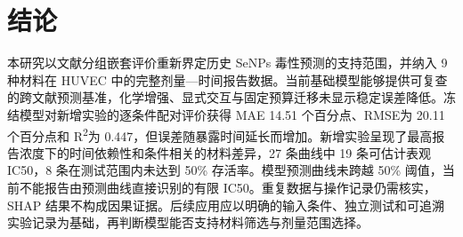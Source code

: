 \section{结论}

本研究以文献分组嵌套评价重新界定历史 SeNPs 毒性预测的支持范围，并纳入 9 种材料在 HUVEC 中的完整剂量—时间报告数据。当前基础模型能够提供可复查的跨文献预测基准，化学增强、显式交互与固定预算迁移未显示稳定误差降低。冻结模型对新增实验的逐条件配对评价获得 MAE 14.51 个百分点、RMSE为 20.11 个百分点和 R\textsuperscript{2}为 0.447，但误差随暴露时间延长而增加。新增实验呈现了最高报告浓度下的时间依赖性和条件相关的材料差异，27 条曲线中 19 条可估计表观 IC50，8 条在测试范围内未达到 50\% 存活率。模型预测曲线未跨越 50\% 阈值，当前不能报告由预测曲线直接识别的有限 IC50。重复数据与操作记录仍需核实，SHAP 结果不构成因果证据。后续应用应以明确的输入条件、独立测试和可追溯实验记录为基础，再判断模型能否支持材料筛选与剂量范围选择。
